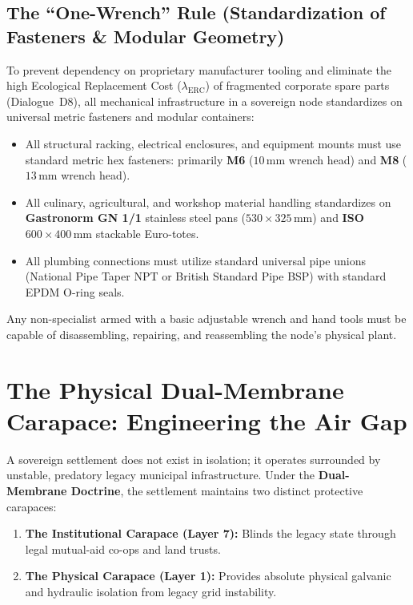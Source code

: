 \subsection{The ``One-Wrench'' Rule (Standardization of Fasteners \& Modular Geometry)}

To prevent dependency on proprietary manufacturer tooling and eliminate the high Ecological Replacement Cost ($\lambda_{\mathrm{ERC}}$) of fragmented corporate spare parts (Dialogue~D8), all mechanical infrastructure in a sovereign node standardizes on universal metric fasteners and modular containers:
\begin{itemize}
    \item All structural racking, electrical enclosures, and equipment mounts must use standard metric hex fasteners: primarily \textbf{M6} ($10\,\mathrm{mm}$ wrench head) and \textbf{M8} ($13\,\mathrm{mm}$ wrench head).
    \item All culinary, agricultural, and workshop material handling standardizes on \textbf{Gastronorm GN 1/1} stainless steel pans ($530 \times 325\,\mathrm{mm}$) and \textbf{ISO $600 \times 400\,\mathrm{mm}$} stackable Euro-totes.
    \item All plumbing connections must utilize standard universal pipe unions (National Pipe Taper NPT or British Standard Pipe BSP) with standard EPDM O-ring seals.
\end{itemize}
Any non-specialist armed with a basic adjustable wrench and hand tools must be capable of disassembling, repairing, and reassembling the node's physical plant.

\section{The Physical Dual-Membrane Carapace: Engineering the Air Gap}

A sovereign settlement does not exist in isolation; it operates surrounded by unstable, predatory legacy municipal infrastructure. Under the \textbf{Dual-Membrane Doctrine}, the settlement maintains two distinct protective carapaces:
\begin{enumerate}
    \item \textbf{The Institutional Carapace (Layer 7):} Blinds the legacy state through legal mutual-aid co-ops and land trusts.
    \item \textbf{The Physical Carapace (Layer 1):} Provides absolute physical galvanic and hydraulic isolation from legacy grid instability.
\end{enumerate}

